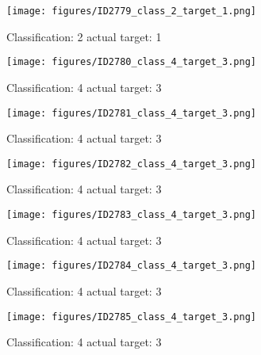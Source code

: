 \begin{figure}[h!]
\begin{center}
\texttt{[image: figures/ID2779\_class\_2\_target\_1.png]}
\end{center}
\caption{ Classification: 2 actual target: 1}
\label{fig:ID2779_class_2_target_1}
\end{figure}
\begin{figure}[h!]
\begin{center}
\texttt{[image: figures/ID2780\_class\_4\_target\_3.png]}
\end{center}
\caption{ Classification: 4 actual target: 3}
\label{fig:ID2780_class_4_target_3}
\end{figure}
\begin{figure}[h!]
\begin{center}
\texttt{[image: figures/ID2781\_class\_4\_target\_3.png]}
\end{center}
\caption{ Classification: 4 actual target: 3}
\label{fig:ID2781_class_4_target_3}
\end{figure}
\begin{figure}[h!]
\begin{center}
\texttt{[image: figures/ID2782\_class\_4\_target\_3.png]}
\end{center}
\caption{ Classification: 4 actual target: 3}
\label{fig:ID2782_class_4_target_3}
\end{figure}
\begin{figure}[h!]
\begin{center}
\texttt{[image: figures/ID2783\_class\_4\_target\_3.png]}
\end{center}
\caption{ Classification: 4 actual target: 3}
\label{fig:ID2783_class_4_target_3}
\end{figure}
\begin{figure}[h!]
\begin{center}
\texttt{[image: figures/ID2784\_class\_4\_target\_3.png]}
\end{center}
\caption{ Classification: 4 actual target: 3}
\label{fig:ID2784_class_4_target_3}
\end{figure}
\begin{figure}[h!]
\begin{center}
\texttt{[image: figures/ID2785\_class\_4\_target\_3.png]}
\end{center}
\caption{ Classification: 4 actual target: 3}
\label{fig:ID2785_class_4_target_3}
\end{figure}
